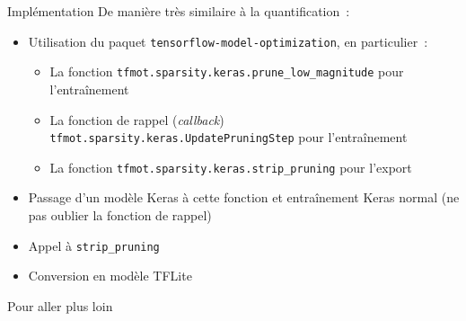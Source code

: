 \begin{frame}{Implémentation}
  De manière très similaire à la quantification~:
  \begin{itemize}
    \item Utilisation du paquet \texttt{tensorflow-model-optimization}, en particulier~:
      \begin{itemize}
        \item La fonction \texttt{tfmot.sparsity.keras.prune\_low\_magnitude} pour l'entraînement
        \item La fonction de rappel (\textit{callback}) \texttt{tfmot.sparsity.keras.UpdatePruningStep} pour l'entraînement
        \item La fonction \texttt{tfmot.sparsity.keras.strip\_pruning} pour l'export
      \end{itemize}
    \item Passage d'un modèle Keras à cette fonction et entraînement Keras normal (ne pas oublier la fonction de rappel)
    \item Appel à \texttt{strip\_pruning}
    \item Conversion en modèle TFLite
  \end{itemize}
\end{frame}

\begin{frame}{Pour aller plus loin}
\end{frame}